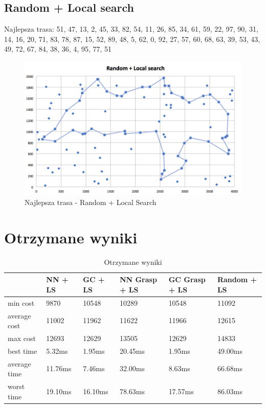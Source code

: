 \documentclass[a4paper 10pt]{article}
\begin{document}
\newpage
\subsection{Random + Local search}
Najlepsza trasa: 51, 47, 13, 2, 45, 33, 82, 54, 11, 26, 85, 34, 61, 59, 22, 97, 90, 31, 14, 16, 20, 71, 83, 78, 87, 15, 52, 89, 48, 5, 62, 0, 92, 27, 57, 60, 68, 63, 39, 53, 43, 49, 72, 67, 84, 38, 36, 4, 95, 77, 51 
\begin{figure} [H]
\centering
\includegraphics[angle=0,width = 1\textwidth, height=!]{images/Random.png}
\caption{Najlepsza trasa - Random + Local Search}
\label{Rys. R}
\end{figure}

\newpage
\section{Otrzymane wyniki}

\begin{table}[H]
\centering
\caption{Otrzymane wyniki}
\label{my-label}
\begin{tabular}{|l|l|l|l|l|l|}
\hline
             & NN + LS & GC + LS & NN Grasp + LS & GC Grasp + LS & Random + LS \\ \hline
min cost     & 9870    & 10548 & 10289 & 10548 & 11092 \\ \hline
average cost & 11002   & 11962 & 11622 & 11966 & 12615 \\ \hline
max cost     & 12693   & 12629 & 13505 & 12629 & 14833\\ \hline
best time    & 5.32ms  & 1.95ms &  20.45ms  & 1.95ms & 49.00ms\\ \hline
average time & 11.76ms & 7.46ms &  32.00ms & 8.63ms & 66.68ms\\ \hline
worst time   & 19.10ms & 16.10ms & 78.63ms & 17.57ms & 86.03ms\\ \hline
\end{tabular}
\end{table}
\end{document}
